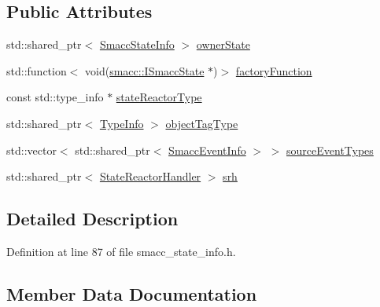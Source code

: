 \subsection*{Public Attributes}
\begin{DoxyCompactItemize}
\item 
std\+::shared\+\_\+ptr$<$ \hyperlink{classsmacc_1_1introspection_1_1SmaccStateInfo}{Smacc\+State\+Info} $>$ \hyperlink{structsmacc_1_1introspection_1_1SmaccStateReactorInfo_a7f79a42095ce284939ca47fb25a14101}{owner\+State}
\item 
std\+::function$<$ void(\hyperlink{classsmacc_1_1ISmaccState}{smacc\+::\+I\+Smacc\+State} $\ast$)$>$ \hyperlink{structsmacc_1_1introspection_1_1SmaccStateReactorInfo_a07d93f820f191aa3f9811fc2e1792b7a}{factory\+Function}
\item 
const std\+::type\+\_\+info $\ast$ \hyperlink{structsmacc_1_1introspection_1_1SmaccStateReactorInfo_a02de210fcdffd81424537d4d8a330609}{state\+Reactor\+Type}
\item 
std\+::shared\+\_\+ptr$<$ \hyperlink{classsmacc_1_1introspection_1_1TypeInfo}{Type\+Info} $>$ \hyperlink{structsmacc_1_1introspection_1_1SmaccStateReactorInfo_ae76d3acd0f68e75051ed002f10539738}{object\+Tag\+Type}
\item 
std\+::vector$<$ std\+::shared\+\_\+ptr$<$ \hyperlink{structsmacc_1_1introspection_1_1SmaccEventInfo}{Smacc\+Event\+Info} $>$ $>$ \hyperlink{structsmacc_1_1introspection_1_1SmaccStateReactorInfo_a66cb20b15e0ad0fbfd5ad20b83462eb6}{source\+Event\+Types}
\item 
std\+::shared\+\_\+ptr$<$ \hyperlink{classsmacc_1_1introspection_1_1StateReactorHandler}{State\+Reactor\+Handler} $>$ \hyperlink{structsmacc_1_1introspection_1_1SmaccStateReactorInfo_a0d28653e507c3f4498475987d5916f76}{srh}
\end{DoxyCompactItemize}


\subsection{Detailed Description}


Definition at line 87 of file smacc\+\_\+state\+\_\+info.\+h.



\subsection{Member Data Documentation}

